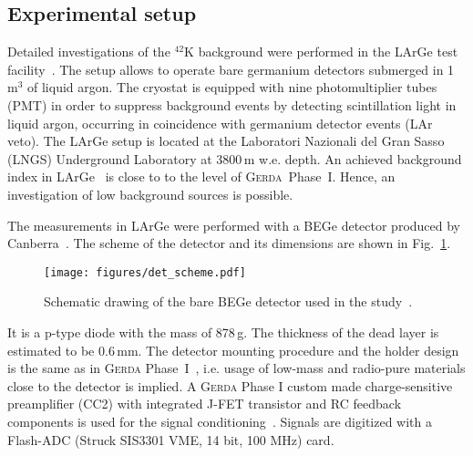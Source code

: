 \documentclass[twocolumn,epjc3]{svjour3}
\newcommand{\Gerda} {{\textsc{Gerda}\xspace}}
\newcommand{\LArGe} {{{LArGe}\xspace}}
\newcommand{\I}[2]{$^{#1}$#2}
\begin{document}
\subsection{Experimental setup}
\label{sec:expersetup}
%
Detailed investigations of the \I{42}{K} background were performed in the \LArGe{} test facility~\cite{LArGe}. The setup allows to operate bare germanium detectors submerged in 1\,m$^3$ of liquid argon. The cryostat is equipped with nine photomultiplier tubes (PMT) in order to suppress background events by detecting scintillation light in liquid argon, occurring in coincidence with germanium detector events (LAr veto). The \LArGe{} setup is located at the Laboratori Nazionali del Gran Sasso (LNGS) Underground Laboratory at 3800\,m w.e. depth. An achieved background index in \LArGe{}~\cite{LArGe} is close to to the level of \Gerda{}~Phase~I. Hence, an investigation of low background sources is possible.

The measurements in \LArGe{} were performed with a BEGe detector produced by Canberra~\cite{canberra}. The scheme of the detector and its dimensions are shown in Fig.~\ref{fig:bareBEGe1}. 
%
\begin{figure}
  \begin{center}
    \texttt{[image: figures/det\_scheme.pdf]}
    \caption{\label{fig:bareBEGe1}Schematic drawing of the bare BEGe detector used in the study~\cite{psd}.}
  \end{center}
\end{figure}
%
It is a p-type diode with the mass of 878\,g. The thickness of the dead layer is estimated to be 0.6\,mm. The detector mounting procedure and the holder design is the same as in \Gerda{} Phase~I~\cite{GERDA}, i.e. usage of low-mass and radio-pure materials close to the detector is implied. A \Gerda{} Phase I custom made charge-sensitive preamplifier (CC2) with integrated J-FET transistor and RC feedback components is used for the signal conditioning~\cite{cc2}. Signals are digitized with a Flash-ADC (Struck SIS3301 VME, 14 bit, 100 MHz) card.
\end{document}
